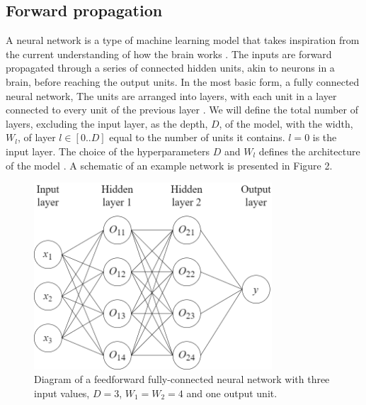 \documentclass[12pt]{article}
\begin{document}
\subsection{Forward propagation}
A neural network is a type of machine learning model that takes inspiration from the current understanding of how the brain works \cite{Minsky69}. The inputs are forward propagated through a series of connected hidden units, akin to neurons in a brain, before reaching the output units. In the most basic form, a fully connected neural network, The units are arranged into layers, with each unit in a layer connected to every unit of the previous layer \cite{Rumelhart86}. We will define the total number of layers, excluding the input layer, as the depth, $D$, of the model, with the width, $W_l$, of layer $l\in[0..D]$ equal to the number of units it contains. $l=0$ is the input layer. The choice of the hyperparameters $D$ and $W_l$ defines the architecture of the model \cite{Haykin98}. A schematic of an example network is presented in Figure 2. 

\begin{figure}[h]
\centering
\includegraphics[width=3.5in]{images/feedforward_nn.png}
\caption{Diagram of a feedforward fully-connected neural network with three input values, $D=3$, $W_1=W_2=4$ and one output unit.}
\end{figure}
\end{document}
